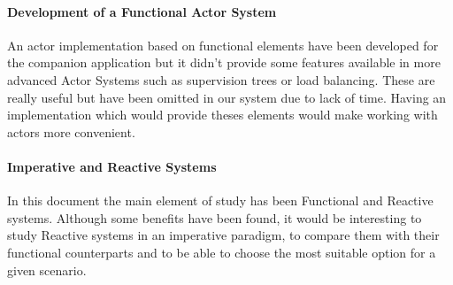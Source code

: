 \documentclass[../main.tex]{subfiles}
\begin{document}
\paragraph{Development of a Functional Actor System}

An actor implementation based on functional elements have been developed for the
companion application but it didn't provide some features available in more advanced Actor Systems
such as supervision trees or load balancing. These are really 
useful but have been omitted in our system due to lack of time. Having an implementation which would provide
theses elements would make working with actors more convenient.

\paragraph{Imperative and Reactive Systems}

In this document the main element of study has been Functional and Reactive
systems. Although some benefits have been found, it would be interesting to study
Reactive systems in an imperative paradigm, to compare them with their
functional counterparts and to be able to choose the most suitable option for a given
scenario.
\end{document}

